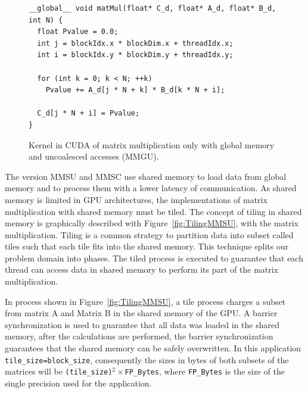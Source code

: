 \begin{figure}[htpb]
\centering
{\scriptsize
\begin{lstlisting}
__global__ void matMul(float* C_d, float* A_d, float* B_d, int N) {
  float Pvalue = 0.0;
  int j = blockIdx.x * blockDim.x + threadIdx.x;
  int i = blockIdx.y * blockDim.y + threadIdx.y;

  for (int k = 0; k < N; ++k) 
    Pvalue += A_d[j * N + k] * B_d[k * N + i];
  
  C_d[j * N + i] = Pvalue;
}

\end{lstlisting}}
\caption{Kernel in CUDA of matrix multiplication only with global memory and uncoalesced accesses (MMGU).}
\label{fig:matMulGMUN}
\end{figure}

The version MMSU and MMSC use shared memory to load data from global memory and to process them with a lower latency of communication. As shared memory is limited in GPU architectures, the implementations of matrix multiplication with shared memory must be tiled. The concept of tiling in shared memory is graphically described with Figure~\ref{fig:TilingMMSU}, with the matrix multiplication. Tiling is a common strategy to partition data into subset called tiles such that each tile fits into the shared memory. This technique splits our problem domain into phases. The tiled process is executed to guarantee that each thread can access data in shared memory to perform its part of the matrix multiplication. 

In process shown in Figure~\ref{fig:TilingMMSU}, a tile process charges a subset from matrix A and Matrix B in the shared memory of the GPU. A barrier synchronization is used to guarantee that all data was loaded in the shared memory, after the calculations are performed, the barrier synchronization guarantees that the shared memory can be safely overwritten. In this application \texttt{tile\_size=block\_size}, consequently the sizes in bytes of both subsets of the matrices will be \texttt{(tile\_size)$^2 \times$FP\_Bytes}, where \texttt{FP\_Bytes} is the size of the single precision used for the application. 

